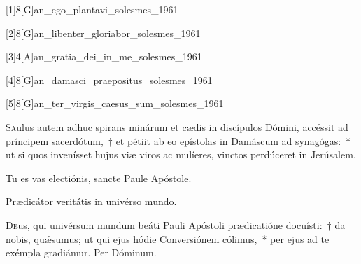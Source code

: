 \documentclass[vesperale_romanum.tex]{subfiles}
\begin{document}


\myrule
\newpage
{}
\label{25_jan}
\duplexmajus


[1]{8}[G]{an_ego_plantavi_solesmes_1961}
\label{109_8G_jan}
{}

[2]{8}[G]{an_libenter_gloriabor_solesmes_1961}


[3]{4}[A]{an_gratia_dei_in_me_solesmes_1961}


[4]{8}[G]{an_damasci_praepositus_solesmes_1961}


[5]{8}[G]{an_ter_virgis_caesus_sum_solesmes_1961}



\lettrine{S}{a}ulus autem adhuc spirans minárum et cædis in discípulos Dómini, accéssit ad príncipem sacerdótum,~† et pétiit ab eo epístolas in Damáscum ad synagógas:~* ut si quos invenísset hujus viæ viros ac mulíeres, vinctos perdúceret in Jerúsalem.

\hymnus
\label{hy_egregie_doctor_solesmes_1961} 
{}

\vv Tu es vas electiónis, sancte Paule Apóstole.

\rr Prædicátor veritátis in univérso mundo.



\oratio

\lettrine{D}{e}us, qui univérsum mundum beáti Pauli Apóstoli prædicatióne docuísti:~† da nobis, quǽsumus; ut qui ejus hódie Conversiónem cólimus,~* per ejus ad te exémpla gradiámur.
Per Dóminum.
\end{document}
